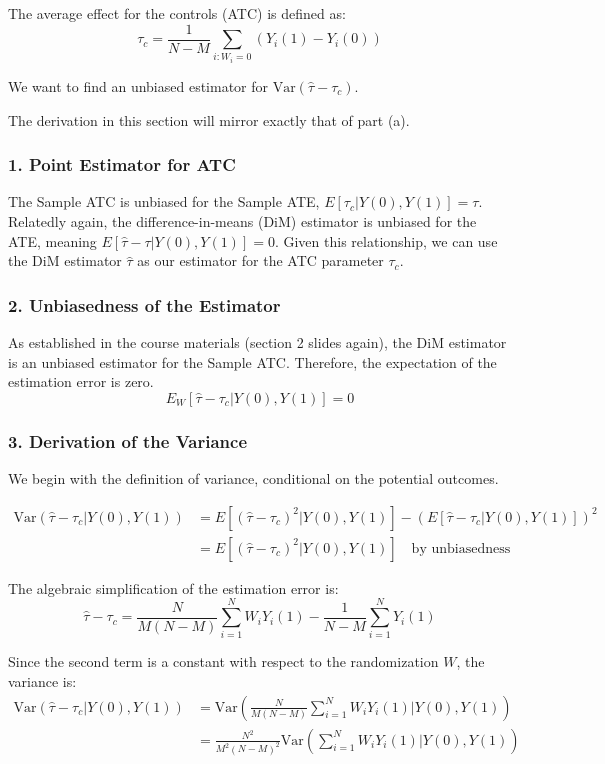 \documentclass[12pt]{article}
\begin{document}
The average effect for the controls (ATC) is defined as:
$$
\tau_{c} = \frac{1}{N-M}\sum_{i: W_i=0} (Y_i(1) - Y_i(0))
$$

We want to find an unbiased estimator for $\text{Var}(\hat{\tau} - \tau_{c})$.

The derivation in this section will mirror exactly that of part (a).

\subsubsection*{1. Point Estimator for ATC}

The Sample ATC is unbiased for the Sample ATE, $E[\tau_{c} | Y(0), Y(1)] = \tau$. Relatedly again, the difference-in-means (DiM) estimator is unbiased for the ATE, meaning $E[\hat{\tau} - \tau | Y(0), Y(1)] = 0$. Given this relationship, we can use the DiM estimator $\hat{\tau}$ as our estimator for the ATC parameter $\tau_{c}$.

\subsubsection*{2. Unbiasedness of the Estimator}
As established in the course materials (section 2 slides again), the DiM estimator is an unbiased estimator for the Sample ATC. Therefore, the expectation of the estimation error is zero.
$$
E_W[\hat{\tau} - \tau_{c} | Y(0), Y(1)] = 0
$$

\subsubsection*{3. Derivation of the Variance}
We begin with the definition of variance, conditional on the potential outcomes.

\begin{align*}
\text{Var}(\hat{\tau} - \tau_{c} | Y(0), Y(1)) &= E[(\hat{\tau} - \tau_{c})^2 | Y(0), Y(1)] - \left(E[\hat{\tau} - \tau_{c} | Y(0), Y(1)]\right)^2 \\
&= E[(\hat{\tau} - \tau_{c})^2 | Y(0), Y(1)] \quad \text{by unbiasedness}
\end{align*}

The algebraic simplification of the estimation error is:
$$
\hat{\tau} - \tau_{c} = \frac{N}{M(N-M)}\sum_{i=1}^{N} W_i Y_i(1) - \frac{1}{N-M}\sum_{i=1}^{N} Y_i(1)
$$

Since the second term is a constant with respect to the randomization $W$, the variance is:
\begin{align*}
\text{Var}(\hat{\tau} - \tau_{c} | Y(0), Y(1)) &= \text{Var}\left(\frac{N}{M(N-M)}\sum_{i=1}^{N} W_i Y_i(1) \bigg| Y(0), Y(1)\right) \\
&= \frac{N^2}{M^2(N-M)^2} \text{Var}\left(\sum_{i=1}^{N} W_i Y_i(1) \bigg| Y(0), Y(1)\right)
\end{align*}
\end{document}
